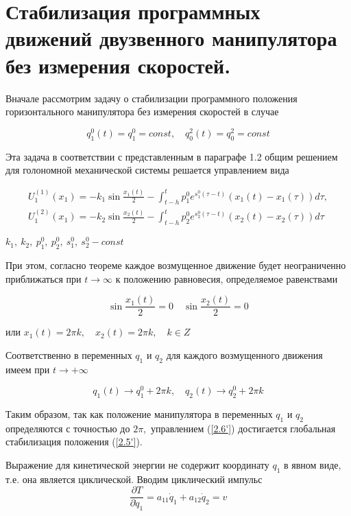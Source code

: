 \section{Стабилизация программных движений двузвенного манипулятора без измерения скоростей.} \label{p22}

Вначале рассмотрим задачу о стабилизации программного положения горизонтального манипулятора без измерения скоростей в случае 

\begin{equation} \label{2.5'}
q^0_1 (t) = q^0_1 = const, \quad q^2_0 (t) = q^2_0 = const
\end{equation}

Эта задача в соответствии с представленным в параграфе 1.2 общим решением для голономной механической системы решается управлением вида 

\begin{equation} \label{2.6'}
\begin{array}{c}
\displaystyle U^{(1)}_1 (x_1) = - k_1 \sin \frac{x_1(t)}{2} - \int_{t-h}^t p_1^0 e^{s_1^0 (\tau - t)} (x_1 (t) - x_1 (\tau)) d \tau, \\ \displaystyle U^{(2)}_1 (x_1) = - k_2 \sin \frac{x_2(t)}{2} - \int_{t-h}^t p_2^0 e^{s_2^0 (\tau - t)} (x_2 (t) - x_2 (\tau)) d \tau
\end{array}
\end{equation}

$k_1, \ k_2, \ p_1^0, \ p_2^0, \ s_1^0, \ s_2^0 - const$

При этом, согласно теореме каждое возмущенное движение будет неограниченно приближаться при $t \to \infty$ к положению равновесия, определяемое равенствами 

$$\sin \frac{x_1(t)}{2} = 0 \quad \sin \frac{x_2(t)}{2} = 0$$

или $x_1(t) = 2 \pi k, \quad x_2(t) = 2 \pi k, \quad k \in Z$

Соответственно в переменных $q_1$ и $q_2$ для каждого возмущенного движения имеем при $t \to +\infty$ 

\begin{equation}
q_1 (t) \to q_1^0 + 2 \pi k, \quad q_2(t) \to q_2^0 + 2 \pi k
\end{equation}


Таким образом, так как положение манипулятора в переменных $q_1$ и $q_2$ определяются с точностью до $2 \pi,$ управлением (\ref{2.6'}) достигается глобальная стабилизация положения (\ref{2.5'}).

Выражение для кинетической энергии не содержит координату $q_1$ в явном виде, т.е. она является циклической. Вводим циклический импульс $$\frac{\partial T}{\partial \dot q_1} = a_{11} \dot q_1 + a_{12} \dot q_2 = v$$

